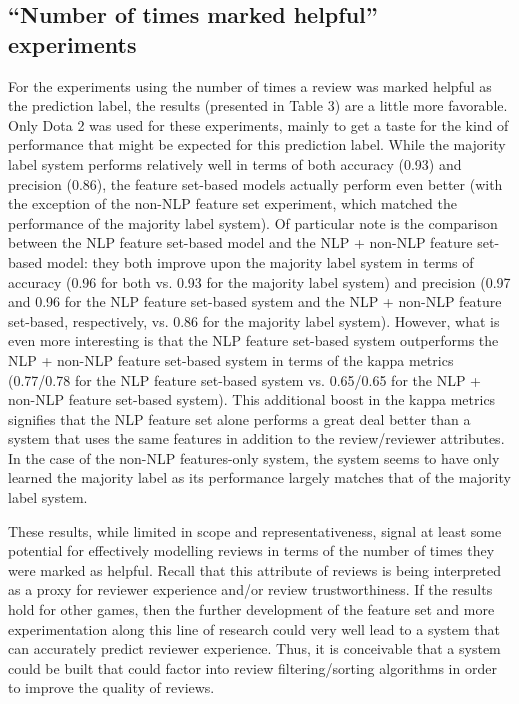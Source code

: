 \documentclass[9pt]{article}
\begin{document}
\subsection{``Number of times marked helpful'' experiments}
\label{ssec:helpful}

For the experiments using the number of times a review was marked helpful as the prediction label, the results (presented in Table 3) are a little more favorable. Only Dota 2 was used for these experiments, mainly to get a taste for the kind of performance that might be expected for this prediction label. While the majority label system performs relatively well in terms of both accuracy (0.93) and precision (0.86), the feature set-based models actually perform even better (with the exception of the non-NLP feature set experiment, which matched the performance of the majority label system). Of particular note is the comparison between the NLP feature set-based model and the NLP + non-NLP feature set-based model: they both improve upon the majority label system in terms of accuracy (0.96 for both vs. 0.93 for the majority label system) and precision (0.97 and 0.96 for the NLP feature set-based system and the NLP + non-NLP feature set-based, respectively, vs. 0.86 for the majority label system). However, what is even more interesting is that the NLP feature set-based system outperforms the NLP + non-NLP feature set-based system in terms of the kappa metrics (0.77/0.78 for the NLP feature set-based system vs. 0.65/0.65 for the NLP + non-NLP feature set-based system). This additional boost in the kappa metrics signifies that the NLP feature set alone performs a great deal better than a system that uses the same features in addition to the review/reviewer attributes. In the case of the non-NLP features-only system, the system seems to have only learned the majority label as its performance largely matches that of the majority label system.

These results, while limited in scope and representativeness, signal at least some potential for effectively modelling reviews in terms of the number of times they were marked as helpful. Recall that this attribute of reviews is being interpreted as a proxy for reviewer experience and/or review trustworthiness. If the results hold for other games, then the further development of the feature set and more experimentation along this line of research could very well lead to a system that can accurately predict reviewer experience. Thus, it is conceivable that a system could be built that could factor into review filtering/sorting algorithms in order to improve the quality of reviews.
\end{document}
